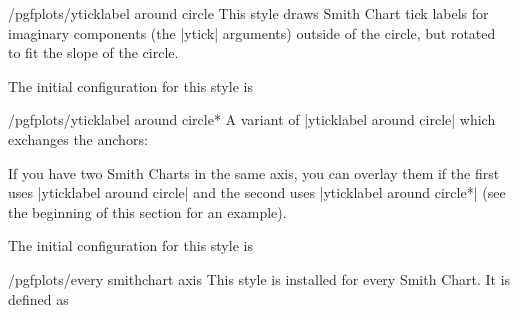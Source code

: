 \begin{stylekey}{/pgfplots/yticklabel around circle}
	This style draws Smith Chart tick labels for imaginary components (the |ytick| arguments) outside of the circle, but rotated to fit the slope of the circle.
\begin{codeexample}[]
\end{codeexample}

	The initial configuration for this style is
\begin{codeexample}
\end{codeexample}
\end{stylekey}

\begin{stylekey}{/pgfplots/yticklabel around circle*}
	A variant of |yticklabel around circle| which exchanges the anchors:
\begin{codeexample}[]
\end{codeexample}
	If you have two Smith Charts in the same axis, you can overlay them if the first uses |yticklabel around circle| and the second uses |yticklabel around circle*| (see the beginning of this section for an example).

	The initial configuration for this style is
\begin{codeexample}
\end{codeexample}
\end{stylekey}

\begin{stylekey}{/pgfplots/every smithchart axis}
	This style is installed for every Smith Chart. It is defined as
\begin{codeexample}
\end{codeexample}
\end{stylekey}

